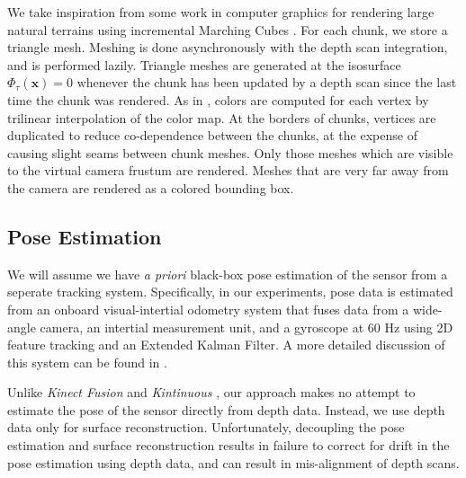 \documentclass[10pt,twocolumn,letterpaper]{article}
\begin{document}
We take inspiration from some work in computer graphics for rendering large
natural terrains \cite{GPUGEMS3} using incremental Marching Cubes
\cite{Lorensen1987}. For each chunk, we store a triangle mesh.
Meshing is done asynchronously with the depth scan integration, and is
performed lazily. Triangle meshes are generated at the isosurface
$\Phi_{\tau}(\mathbf{x}) = 0$ whenever the chunk has been updated by a depth
scan since the last time the chunk was rendered. As in \cite{Bylow2013,
Whelan2013},  colors are computed for each vertex by trilinear interpolation of
the color map. At the borders of chunks, vertices are duplicated to reduce
co-dependence between the chunks, at the expense of causing slight seams
between chunk meshes. Only those meshes which are visible to the virtual camera
frustum are rendered. Meshes that are very far away from the camera are
rendered as a colored bounding box.

\subsection{Pose Estimation}
\label{section:pose}
We will assume we  have \textit{a priori} black-box pose estimation of
the sensor from a seperate tracking system. Specifically, in our experiments,
pose data is estimated from an onboard visual-intertial odometry system that
fuses data from a wide-angle camera, an intertial measurement unit, and a
gyroscope at 60 Hz using 2D feature tracking and an Extended Kalman Filter. A
more detailed discussion of this system can be found in \cite{VINS}. 

Unlike \textit{Kinect Fusion} \cite{Newcombe} and \textit{Kintinuous}
\cite{Whelan2013}, our approach makes no attempt to estimate the pose of the
sensor directly from depth data. Instead, we use depth data only for surface
reconstruction. Unfortunately, decoupling the pose estimation and surface
reconstruction results in failure to correct for drift in the pose estimation
using depth data, and can result in mis-alignment of depth scans.
\end{document}
